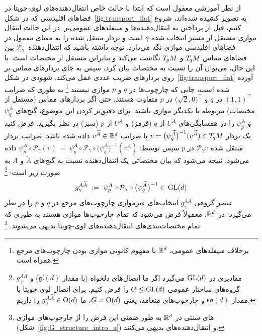 از نظر آموزشی معقول است که ابتدا با حالت خاص انتقال‌دهنده‌های لوی-چویتا در فضاهای اقلیدسی که در شکل~\ref{fig:transport_flat} به تصویر کشیده شده‌اند، شروع کنیم، قبل از پرداختن به انتقال‌دهنده‌ها و منیفلدهای عمومی‌تر.
در این حالت انتقال موازی مستقل از مسیر انتخاب شده $\gamma$ است و بردار منتقل شده را به معنای معمول در فضاهای اقلیدسی موازی نگه می‌دارد.
توجه داشته باشید که انتقال‌دهنده~$\mathcal{P}_\gamma$ بین فضاهای مماس $T_{\mkern-1.5mu q}\mkern-.5muM$ و $T_{\mkern-1.5mu p}\mkern-.5muM$ نگاشت می‌کند و بنابراین مستقل از مختصات است.
با این حال، می‌توان آن را نسبت به مختصات بیان کرد، سپس به جای بردارهای مماس بر روی بردارهای ضریب عددی عمل می‌کند.
شهودی در شکل~\ref{fig:transport_flat} آورده شده است، جایی که چارچوب‌ها در $q$ و $p$ موازی نیستند%
\footnote{
	برخلاف منیفلدهای عمومی، $\mathbb{R}^d$ با مفهوم کانونی موازی بودن چارچوب‌های مرجع همراه است.
}
به طوری که ضرایب $(1,1)^\top$ در $q$ و $\big(\sqrt{2},0\big)^\top$ در $p$ متفاوت هستند، حتی اگر بردارهای مماس (مستقل از مختصات) مربوطه با یکدیگر موازی باشند.
برای دقیق‌تر کردن این موضوع، گیج‌های $\psi_q^{\widetilde{A}}$ و $\psi_p^A$ را در همسایگی‌های $U^{\widetilde{A}}$ از $q$ (قرمز) و $U^A$ از $p$ (سبز) در نظر بگیرید.
فرض کنید یک بردار $v = \big( \psi_q^{\widetilde{A}} \big)^{-1} (v^{\widetilde{A}}) \in T_{\mkern-1.5mu q}\mkern-.5muM$ با ضرایب $v^{\widetilde{A}} \in \mathbb{R}^d$ داده شده باشد.
ضرایب بردار منتقل شده $\mathcal{P}_\gamma v$ در $p$ سپس توسط:
$
\psi_p^A \circ \mathcal{P}_\gamma (v)
\ =\ \psi_p^A \circ \mathcal{P}_\gamma \circ \big(\psi_q^{\widetilde{A}}\big)^{-1} (v^{\widetilde{A}})
$
داده می‌شود.
نتیجه می‌شود که بیان مختصاتی یک انتقال‌دهنده نسبت به گیج‌های $\widetilde{A}$ و $A$ به صورت زیر است:%
\footnote{
	$g_\gamma^{A\widetilde{A}}$ مقادیری در $\operatorname{GL}(d)$ می‌گیرد اگر ما اتصال‌های دلخواه (با مقدار $\mathfrak{gl}(d)$) و گروه‌های ساختار عمومی $G \leq \operatorname{GL}(d)$ را فرض کنیم.
	برای اتصال لوی-چویتا با مقدار $\mathfrak{so}(d)$ و چارچوب‌های متعامد، یعنی $G=\operatorname{O}(d)$، ما $g_\gamma^{A\widetilde{A}} \in \operatorname{O}(d)$ را داریم.
}
\begin{align}\label{eq:transporter_gauge}
	g_\gamma^{A\widetilde{A}} \ :=\ \psi_p^A \circ \mathcal{P}_\gamma \circ \big( \psi_q^{\widetilde{A}} \mkern1mu\big)^{-1} \in\, \operatorname{GL}(d)
\end{align}
عنصر گروهی $g_\gamma^{A\widetilde{A}}$ انتخاب‌های غیرموازی چارچوب‌های مرجع در $q$ و $p$ را در نظر می‌گیرد.
در $\mathbb{R}^d$، معمولاً فرض می‌شود که تمام چارچوب‌ها موازی هستند به طوری که تمام مختصات‌بندی‌های انتقال‌دهنده‌های لوی-چویتا بدیهی می‌شوند.%
\footnote{
	\CNN{}های سنتی در $\mathbb{R}^d$ به طور ضمنی این فرض را از چارچوب‌های موازی (شکل~\ref{fig:G_structure_intro_a}) و انتقال‌دهنده‌های بدیهی می‌کنند.
}

